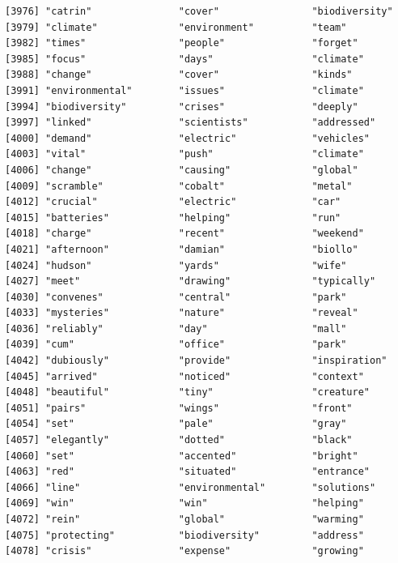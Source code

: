 \documentclass[
  letterpaper,
  DIV=11,
  numbers=noendperiod]{scrartcl}
\begin{document}
\begin{verbatim}
[3976] "catrin"               "cover"                "biodiversity"        
[3979] "climate"              "environment"          "team"                
[3982] "times"                "people"               "forget"              
[3985] "focus"                "days"                 "climate"             
[3988] "change"               "cover"                "kinds"               
[3991] "environmental"        "issues"               "climate"             
[3994] "biodiversity"         "crises"               "deeply"              
[3997] "linked"               "scientists"           "addressed"           
[4000] "demand"               "electric"             "vehicles"            
[4003] "vital"                "push"                 "climate"             
[4006] "change"               "causing"              "global"              
[4009] "scramble"             "cobalt"               "metal"               
[4012] "crucial"              "electric"             "car"                 
[4015] "batteries"            "helping"              "run"                 
[4018] "charge"               "recent"               "weekend"             
[4021] "afternoon"            "damian"               "biollo"              
[4024] "hudson"               "yards"                "wife"                
[4027] "meet"                 "drawing"              "typically"           
[4030] "convenes"             "central"              "park"                
[4033] "mysteries"            "nature"               "reveal"              
[4036] "reliably"             "day"                  "mall"                
[4039] "cum"                  "office"               "park"                
[4042] "dubiously"            "provide"              "inspiration"         
[4045] "arrived"              "noticed"              "context"             
[4048] "beautiful"            "tiny"                 "creature"            
[4051] "pairs"                "wings"                "front"               
[4054] "set"                  "pale"                 "gray"                
[4057] "elegantly"            "dotted"               "black"               
[4060] "set"                  "accented"             "bright"              
[4063] "red"                  "situated"             "entrance"            
[4066] "line"                 "environmental"        "solutions"           
[4069] "win"                  "win"                  "helping"             
[4072] "rein"                 "global"               "warming"             
[4075] "protecting"           "biodiversity"         "address"             
[4078] "crisis"               "expense"              "growing"             

\end{verbatim}
\end{document}
